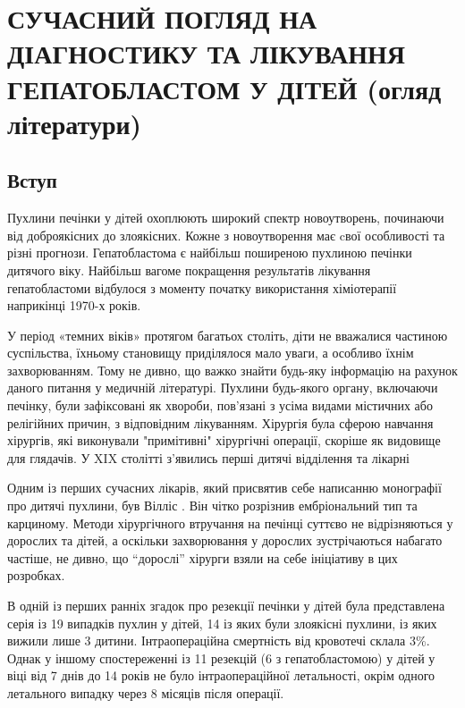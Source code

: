 \chapter{СУЧАСНИЙ ПОГЛЯД НА ДІАГНОСТИКУ ТА ЛІКУВАННЯ ГЕПАТОБЛАСТОМ У ДІТЕЙ (огляд літератури)}

\section{Вступ}
Пухлини печінки у дітей охоплюють широкий спектр новоутворень, починаючи від доброякісних до злоякісних. Кожне з новоутворення має cвої особливості та різні  прогнози. Гепатобластома є найбільш поширеною пухлиною печінки дитячого віку. Найбільш вагоме покращення результатів лікування гепатобластоми відбулося з моменту початку використання хіміотерапії наприкінці 1970-х років. 

У період «темних віків» протягом багатьох століть, діти не вважалися частиною суспільства, їхньому становищу приділялося мало уваги, а особливо їхнім захворюванням. Тому не дивно, що важко знайти будь-яку інформацію на рахунок даного питання у медичній літературі. Пухлини будь-якого органу, включаючи печінку, були зафіксовані як хвороби, пов'язані з усіма видами містичних або релігійних причин, з відповідним лікуванням. Хірургія була сферою навчання хірургів, які виконували "примітивні" хірургічні операції, скоріше як видовище для глядачів. У XIX столітті з’явились перші дитячі відділення та лікарні

Одним із перших сучасних лікарів, який присвятив себе написанню монографії про дитячі пухлини, був Вілліс \cite{pmid10466608}. Він чітко розрізнив ембріональний тип та карциному. 
Методи хірургічного втручання на печінці суттєво не відрізняються у дорослих та дітей, а оскільки захворювання у дорослих зустрічаються набагато частіше, не дивно, що “дорослі” хірурги взяли на себе ініціативу в цих розробках. 

В одній із перших ранніх згадок про резекції печінки у дітей була представлена серія із 19 випадків пухлин у дітей, 14 із яких були злоякісні пухлини,  із яких вижили лише 3 дитини. Інтраопераційна смертність від кровотечі склала 3\%. Однак у іншому спостереженні \cite{pmid10839879} із 11 резекцій (6 з гепатобластомою) у дітей у віці від 7 днів до 14 років не було інтраопераційної летальності, окрім одного летального випадку через 8 місяців після операції. 

